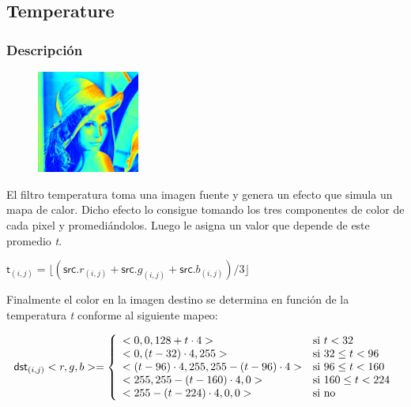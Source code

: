 \subsection{Temperature}

\subsubsection{Descripción}

\begin{figure}
	\centering
	\includegraphics[width=0.3\textwidth]{imagenes/lenaTEMP.jpg}
\end{figure}

El filtro temperatura toma una imagen fuente y genera un efecto que simula un mapa de calor. Dicho efecto lo consigue tomando los tres componentes de color de cada pixel y promediándolos. Luego le asigna un valor que depende de este promedio \textit{t}.

\begin{center}
$\mathsf{t}_{(i,j)} = \lfloor(\mathsf{src}.r_{(i,j)} + \mathsf{src}.g_{(i,j)} + \mathsf{src}.b_{(i,j)}) / 3\rfloor$
\end{center}

Finalmente el color en la imagen destino se determina en función de la temperatura \textit{t} conforme al siguiente mapeo:

\begin{center}
\begin{displaymath}
\mathsf{dst}_{(i,j)}<r,g,b> = \left\{
\begin{array}{l l}
			<0,0, 128 + t \cdot 4> & \text{si }t < 32\\
			<0, (t - 32) \cdot 4, 255> & \text{si }32 \le t < 96\\
			<(t-96) \cdot 4, 255, 255 - (t-96) \cdot 4> & \text{si }96 \le t < 160\\
			<255, 255 - (t - 160) \cdot 4, 0> & \text{si }160 \le t < 224\\
			<255 - (t - 224) \cdot 4, 0 , 0> & \text{si no} \\
\end{array}
\right.
\end{displaymath}
\end{center}

